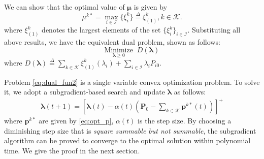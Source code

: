 \documentclass[conference]{IEEEtran}
\newcommand{\mdef}{\overset{\Delta}{=}}
\newcommand{\mi}{\mathcal{I}}
\newcommand{\mk}{\mathcal{K}}
\newcommand{\bb}{\boldsymbol}
\begin{document}
We can show that the optimal value of $\bb{\mu}$ is given by
\begin{equation}
\label{eq:multiplier_mu}
    \mu^{k*}= \max\limits_{i\in\mi}\{\xi_i^{k}\}\mdef \xi_{(1)}^{k},k\in\mk.
\end{equation}
where $\xi_{(1)}^{k}$ denotes the largest elements of the set $\{\xi_{i}^{k}\}_{i\in\mi}$.
Substituting all above results, we have the equivalent dual problem, shown as follows:
\begin{equation}
\label{eq:dual_fun2}
    \underset{ \bb{\lambda}\ge 0}{\text{Minimize}}\;\; D(\bb{\lambda})
\end{equation}
where
$
    D(\bb{\lambda})\mdef\sum_{k\in\mk} \xi_{(1)}^k({\lambda_i})+\sum_{i\in\mi}\lambda_iP_{i0}.
$

Problem \eqref{eq:dual_fun2} is a single variable convex optimization problem.
To solve it, we adopt a subgradient-based search and update $\bb{\lambda}$ as follows:
\begin{eqnarray}  \bb{\lambda}(t+1)\!=\!\left[\bb{\lambda}(t)-\alpha(t)\left(\bb{P}_0-\sum_{k\in\mk}\bb{p}^{k*}(t)\right)\right]^+
\end{eqnarray}
where $\bb{p}^{k*}$ are given by \eqref{eq:opt_p}, $\alpha(t)$ is the step size. By choosing a diminishing step size that is \emph{square summable but not summable}, the subgradient algorithm can be proved to converge to the optimal solution within polynomial time\cite{Bertsekas1999nonlinear}. We give the proof in the next section.
\end{document}
